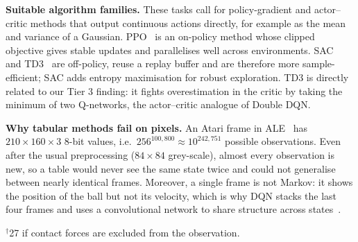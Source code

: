 \documentclass[10pt,twocolumn,letterpaper]{article}
\begin{document}
\textbf{Suitable algorithm families.} These tasks call for policy-gradient and actor--critic methods that output continuous actions directly, for example as the mean and variance of a Gaussian. PPO~\cite{schulman2017} is an on-policy method whose clipped objective gives stable updates and parallelises well across environments. SAC~\cite{haarnoja2018} and TD3~\cite{fujimoto2018} are off-policy, reuse a replay buffer and are therefore more sample-efficient; SAC adds entropy maximisation for robust exploration. TD3 is directly related to our Tier 3 finding: it fights overestimation in the critic by taking the minimum of two Q-networks, the actor--critic analogue of Double DQN.

\textbf{Why tabular methods fail on pixels.} An Atari frame in ALE~\cite{bellemare2013} has $210\times160\times3$ 8-bit values, i.e.\ $256^{100{,}800}\approx10^{242{,}751}$ possible observations. Even after the usual preprocessing ($84\times84$ grey-scale), almost every observation is new, so a table would never see the same state twice and could not generalise between nearly identical frames. Moreover, a single frame is not Markov: it shows the position of the ball but not its velocity, which is why DQN stacks the last four frames and uses a convolutional network to share structure across states~\cite{mnih2015}.

\begin{table}[t]
\centering
\caption{Observation and action dimensions (verified with Gymnasium~1.4 and MuJoCo~3) and the size of the discretised action space with $k$ bins per action dimension.}
\label{tab:analysis}
\small
\setlength{\tabcolsep}{3.5pt}
\vspace{2pt}

\footnotesize $^\dagger$27 if contact forces are excluded from the observation.
\end{table}
\end{document}
